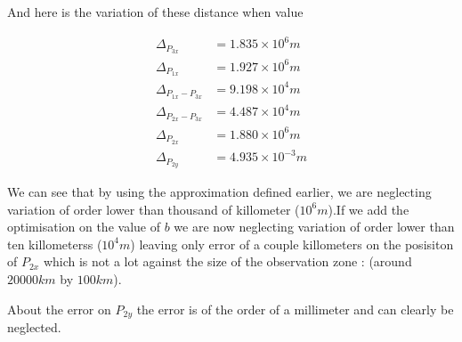 \documentclass[11pt]{article} %
\begin{document}
		And here is the variation of these distance when value 
		
		$$
		\begin{align}
			\Delta_{P_{3x}}&=1.835\times10^6 m \\
			\Delta_{P_{1x}}&=1.927\times10^6 m \\ 
			\Delta_{P_{1x}-P_{3x}}&=9.198\times10^4 m \\ 
			\Delta_{P_{2x}-P_{3x}}&=4.487\times10^4 m \\ 
			\Delta_{P_{2x}}&=1.880\times10^6 m \\
			\Delta_{P_{2y}}&= 4.935\times10^{-3} m
		\end{align}
		$$
		
		
		We can see that by using the approximation defined earlier, we are neglecting variation of order lower than thousand of killometer ($10^6 m$).If we add the optimisation on the value of $b$ we are now neglecting variation of order lower than ten killometerss ($10^4 m$) leaving only error of a couple killometers on the  posisiton of $P_{2x}$ which is not a lot against the size of the observation zone : (around $ 20000 km $ by $100 km$).
		
		About the error on $P_{2y}$ the error is of the order of a millimeter and can clearly be neglected.
		
		
		
		
		
		
\end{document}
